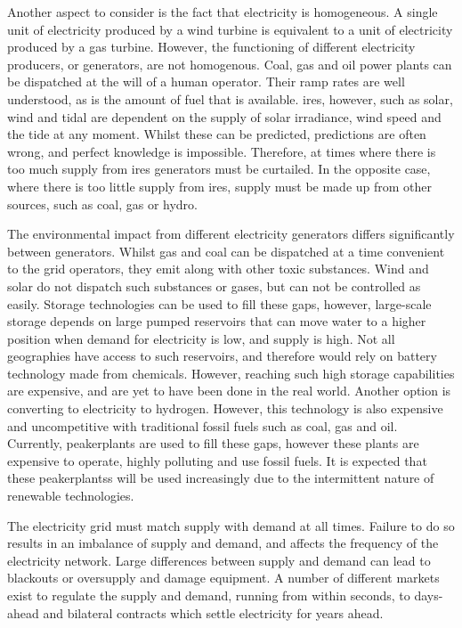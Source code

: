 Another aspect to consider is the fact that electricity is homogeneous. A single unit of electricity produced by a wind turbine is equivalent to a unit of electricity produced by a gas turbine. However, the functioning of different electricity producers, or generators, are not homogenous. Coal, gas and oil power plants can be \gls{dispatched} at the will of a human operator. Their ramp rates are well understood, as is the amount of fuel that is available. \Gls{ires}, however, such as solar, wind and tidal are dependent on the supply of solar irradiance, wind speed and the tide at any moment. Whilst these can be predicted, predictions are often wrong, and perfect knowledge is impossible. Therefore, at times where there is too much supply from \acrfull{ires} generators must be curtailed. In the opposite case, where there is too little supply from \acrshort{ires}, supply must be made up from other sources, such as coal, gas or hydro.

The environmental impact from different electricity generators differs significantly between generators. Whilst gas and coal can be dispatched at a time convenient to the grid operators, they emit  along with other toxic substances. Wind and solar do not dispatch such substances or gases, but can not be controlled as easily. Storage technologies can be used to fill these gaps, however, large-scale storage depends on large pumped reservoirs that can move water to a higher position when demand for electricity is low, and supply is high. Not all geographies have access to such reservoirs, and therefore would rely on battery technology made from chemicals. However, reaching such high storage capabilities are expensive, and are yet to have been done in the real world. Another option is converting to electricity to hydrogen. However, this technology is also expensive and uncompetitive with traditional fossil fuels such as coal, gas and oil. Currently, \gls{peakerplants} are used to fill these gaps, however these plants are expensive to operate, highly polluting and use fossil fuels. It is expected that these \gls{peakerplants}s will be used increasingly due to the intermittent nature of renewable technologies. 


The electricity grid must match supply with demand at all times. Failure to do so results in an imbalance of supply and demand, and affects the frequency of the electricity network. Large differences between supply and demand can lead to blackouts or oversupply and damage equipment. A number of different markets exist to regulate the supply and demand, running from within seconds, to days-ahead and bilateral contracts which settle electricity for years ahead.

